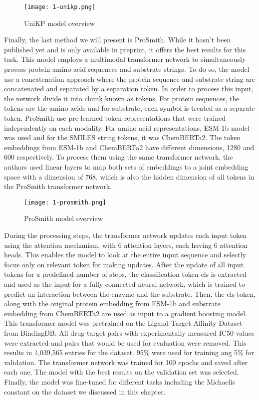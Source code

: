 \begin{figure}
  \centering
  \texttt{[image: 1-unikp.png]}
  \caption{UniKP model overview}
  \label{fig:unikp}
\end{figure}

Finally, the last method we will present is ProSmith. \cite{prosmith} While it hasn't been published yet
and is only available in preprint, it offers the best results for this task. This model employs a multimodal
transformer network to simultaneously process protein amino acid sequences and substrate strings. To do so,
the model use a concatenation approach where the protein sequence and substrate string are concatenated 
and separated by a separation token. In order to process this input, the network divide it into chunk 
known as tokens. For protein sequences, the tokens are the amino acids and for substrate, each symbol is
treated as a separate token. ProSmith use pre-learned token representations that were trained independently
on each modality. For amino acid representations, ESM-1b model was used and for the SMILES string tokens, it
was ChemBERTa2. \cite{esm1,chemberta} The token embeddings from ESM-1b and ChemBERTa2 have different dimensions,
1280 and 600 respectively. To process them using the same transformer network, the authors used linear layers
to map both sets of embeddings to a joint embedding space with a dimension of 768, which is also the hidden
dimension of all tokens in the ProSmith transformer network. 

\begin{figure}
  \centering
  \texttt{[image: 1-prosmith.png]}
  \caption{ProSmith model overview}
  \label{fig:prosmith}
\end{figure}

During the processing steps, the transformer 
network updates each input token using the attention mechanism, with 6 attention layers, each having
6 attention heads. \cite{attention} This enables the model
to look at the entire input sequence and selectly focus only on relevant token for making updates. 
After the update of all input tokens for a predefined number of steps, the classification token cls is
extracted and used as the input for a fully connected neural network, which is trained to predict an
interaction between the enzyme and the substrate. Then, the cls token, along with the original protein 
embedding from ESM-1b and substrate embedding from ChemBERTa2 are used as input to a gradient boosting model.
\cite{xgboost} This transformer model was pretrained on the Ligand-Target-Affinity Dataset from BindingDB.
\cite{bindingdb} All drug-target pairs with experimentally measured IC50 values were extracted and pairs 
that would be used for evaluation were removed. This results in 1,039,565 entries for the dataset. 95\%
were used for training ang 5\% for validation. The transformer network was trained for 100 epochs and saved
after each one. The model with the best results on the validation set was selected. Finally, the model
was fine-tuned for different tasks including the Michaelis constant on the dataset we discussed in this 
chapter.

